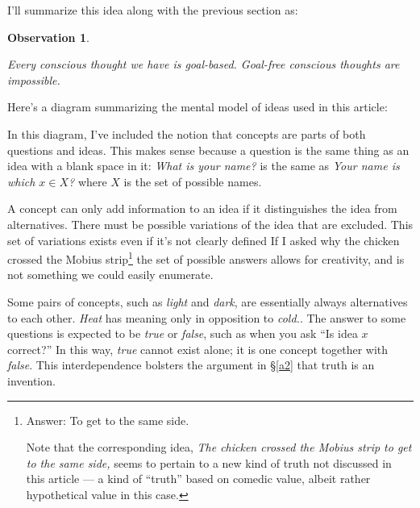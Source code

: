 \documentclass[11pt, oneside]{article}
\newtheorem{obs}{Observation}
\begin{document}

I'll summarize this idea along with the previous section as:
\newcommand{\obsfour}{
    Every conscious thought we have is goal-based.
    Goal-free conscious thoughts are impossible.
}
\begin{obs}\label{o4}
    \obsfour
\end{obs}

Here's a diagram summarizing the mental model of ideas used in this
article:

\begin{center}
%
\end{center}

In this diagram, I've included the notion that concepts are parts of both
questions and ideas.
This makes sense because a question is the same thing as an idea
with a blank space in it: {\em What is your name?} is the same as
{\em Your name is which $x\in X$?} where $X$ is the set of possible names.

A concept can only add information to an idea if it distinguishes the idea
from alternatives.
There must be possible variations of the idea that are excluded.
This set of variations exists even if it's not clearly defined
If I asked why the chicken crossed the Mobius strip\footnote{Answer: To
get to the same side.\par Note that the corresponding idea, {\em The chicken
crossed the Mobius strip to get to the same side,} seems to pertain to a new
kind of truth not discussed in this article ---
a kind of ``truth'' based on comedic
value, albeit rather hypothetical value in this case.}
the set of possible answers allows for creativity, and is not something we could
easily enumerate.

Some pairs of concepts, such as {\em light} and {\em dark}, are essentially
always alternatives to each other.
{\em Heat} has meaning only in opposition to {\em cold.}.
The answer to some questions is expected to be {\em true} or {\em false},
such as when you ask ``Is idea $x$ correct?''
In this way, {\em true} cannot exist alone; it is one concept
together with {\em false}.
This interdependence bolsters the argument in \S\ref{a2} that truth is
an invention.
\end{document}
